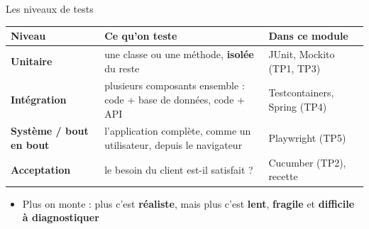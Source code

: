 \documentclass[aspectratio=169,10pt]{beamer}
\begin{document}
\begin{frame}{Les niveaux de tests}
  \small
  \begin{datacard}
    \begin{tabular}{@{}p{2.6cm}p{6.0cm}p{3.6cm}@{}}
      \toprule
      \textbf{Niveau} & \textbf{Ce qu'on teste} & \textbf{Dans ce module} \\
      \midrule
      \textbf{Unitaire} & une classe ou une méthode, \textbf{isolée} du reste & JUnit, Mockito (TP1, TP3) \\
      \textbf{Intégration} & plusieurs composants ensemble : code + base de données, code + API & Testcontainers, Spring (TP4) \\
      \textbf{Système / bout en bout} & l'application complète, comme un utilisateur, depuis le navigateur & Playwright (TP5) \\
      \textbf{Acceptation} & le besoin du client est-il satisfait ? & Cucumber (TP2), recette \\
      \bottomrule
    \end{tabular}
  \end{datacard}
  \vspace{2mm}
  \begin{itemize}
    \item Plus on monte : plus c'est \textbf{réaliste}, mais plus c'est \textbf{lent}, \textbf{fragile} et \textbf{difficile à diagnostiquer}
  \end{itemize}
\end{frame}
\end{document}
